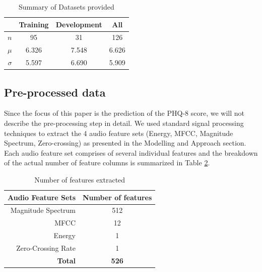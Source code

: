 \documentclass{article}
\begin{document}
 	\begin{table}[h]
 		\begin{center}
  			\begin{tabular}{ | r | c | c | c | }
    			\hline
			 		& \bfseries Training	& \bfseries Development 	& \bfseries All \\ \hline
			 $n$		& 95 			& 31 				& 126 \\ \hline
			 $\mu$	& 6.326 		& 7.548			& 6.626 \\ \hline
			 $\sigma$	& 5.597 		& 6.690 			& 5.909 \\ \hline
			 \end{tabular}
		\end{center}
 	\caption{Summary of Datasets provided}
 	\label{summary_table}
 	\end{table}

	\subsection{Pre-processed data}
	Since the focus of this paper is the prediction of the PHQ-8 score, we will not describe the pre-processing step in detail.
	We used standard signal processing techniques to extract the 4 audio feature sets (Energy, MFCC, Magnitude Spectrum, Zero-crossing) as presented in the Modelling and Approach section.
	Each audio feature set comprises of several individual features and the breakdown of the actual number of feature columns is summarized in Table \ref{no_features}.

 	\begin{table}[h]
 		\begin{center}
  			\begin{tabular}{ | r | c | }
    			\hline
			 \bfseries Audio Feature Sets 	& \bfseries Number of features \\ \hline
			 Magnitude Spectrum		& 512 \\ \hline
			 MFCC 				& 12 \\ \hline
			 Energy 				& 1 \\ \hline
			 Zero-Crossing Rate 		& 1 \\ \hline
			 \bfseries Total			& \bfseries 526 \\ \hline
			 \end{tabular}
		\end{center}
 	\caption{Number of features extracted}
 	\label{no_features}
 	\end{table}
\end{document}
